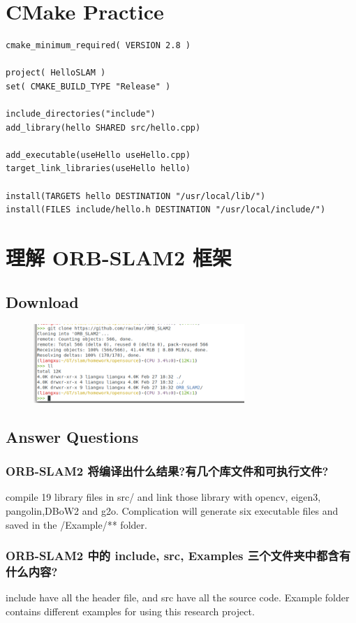 \documentclass{article}
\begin{document}
\begin{CJK*}{UTF8}{gbsn}
\section{CMake Practice}
\begin{lstlisting}
cmake_minimum_required( VERSION 2.8 )

project( HelloSLAM )
set( CMAKE_BUILD_TYPE "Release" )

include_directories("include")
add_library(hello SHARED src/hello.cpp)

add_executable(useHello useHello.cpp)
target_link_libraries(useHello hello)

install(TARGETS hello DESTINATION "/usr/local/lib/")
install(FILES include/hello.h DESTINATION "/usr/local/include/")
\end{lstlisting}


\section{理解 ORB-SLAM2 框架}
\subsection{Download}

\begin{figure}[h]
	\includegraphics[width=8cm]{download_verf.png}
	\centering
\end{figure}

\subsection{Answer Questions}
\subsubsection{ORB-SLAM2 将编译出什么结果?有几个库文件和可执行文件?}
compile 19 library files in src/ and link those library with opencv, eigen3, pangolin,DBoW2 and g2o. Complication will generate six executable files and saved in the /Example/** folder. 

\subsubsection{ORB-SLAM2 中的 include, src, Examples 三个文件夹中都含有什么内容?}
include have all the header file, and src have all the source code. Example folder contains different examples for using this research project. 


\end{CJK*}
\end{document}
